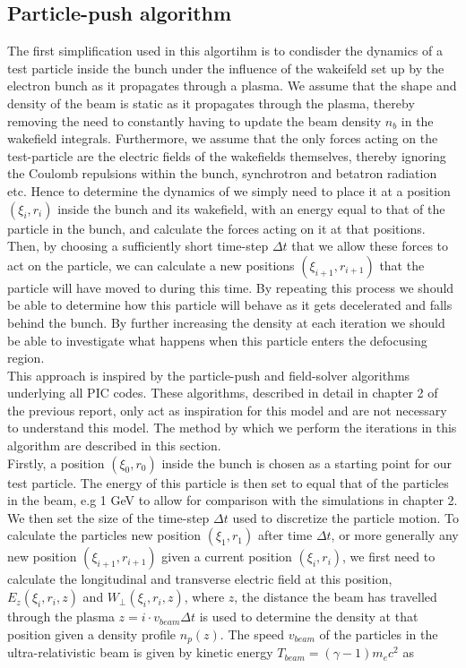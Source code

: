 \subsection{Particle-push algorithm}
The first simplification used in this algortihm is to condisder the dynamics of a test particle inside the bunch under the influence of the wakeifeld set up by the electron bunch as it propagates through a plasma. We assume that the shape and density of the beam is static as it propagates through the plasma, thereby removing the need to constantly having to update the beam density $n_b$ in the wakefield integrals. Furthermore, we assume that the only forces acting on the test-particle are the electric fields of the wakefields themselves, thereby ignoring the Coulomb repulsions within the bunch, synchrotron and betatron radiation etc. Hence to determine the dynamics of we simply need to place it at a position $(\xi_i,r_i)$ inside the bunch and its wakefield, with an energy equal to that of the particle in the bunch, and calculate the forces acting on it at that positions. Then, by choosing a sufficiently short time-step $\Delta t$ that we allow these forces to act on the particle, we can calculate a new positions $(\xi_{i+1},r_{i+1})$ that the particle will have moved to during this time. By repeating this process we should be able to determine how this particle will behave as it gets decelerated and falls behind the bunch. By further increasing the density at each iteration we should be able to investigate what happens when this particle enters the defocusing region.\\
\indent This approach is inspired by the particle-push and field-solver algorithms underlying all PIC codes. These algorithms, described in detail in chapter 2 of the previous report, only act as inspiration for this model and are not necessary to understand this model. The method by which we perform the iterations in this algorithm are described in this section.\\
Firstly, a position $(\xi_{0},r_{0})$ inside the bunch is chosen as a starting point for our test particle. The energy of this particle is then set to equal that of the particles in the beam, e.g 1 GeV to allow for comparison with the simulations in chapter 2. We then set the size of the time-step $\Delta t$ used to discretize the particle motion. To calculate the particles new position $(\xi_{1},r_{1})$ after time $\Delta t$, or more generally any new position $(\xi_{i+1},r_{i+1})$ given a current position $(\xi_{i},r_{i})$, we first need to calculate the longitudinal and transverse electric field at this position, $E_{z}(\xi_i,r_i,z)$ and $W_{\perp}(\xi_i,r_i,z)$, where $z$, the distance the beam has travelled through the plasma $z=i\cdot v_{beam}\Delta t$ is used to determine the density at that position given a density profile $n_p(z)$. The speed $v_{beam}$ of the particles in the ultra-relativistic beam is given by kinetic energy $T_{beam}=(\gamma-1)m_ec^2$ as
